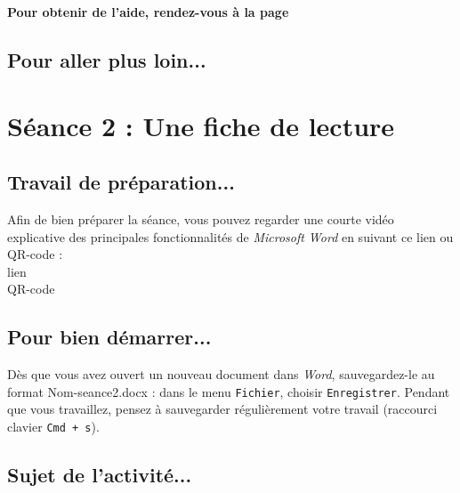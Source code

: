 \textbf{Pour obtenir de l'aide, rendez-vous à la page \pageref{aide_seancesWord3}}

\subsection{Pour aller plus loin...}

\vfill




%
%
%
%

\pagebreak

\section{Séance 2 : Une fiche de lecture}\label{ficheTexte4e3}

\subsection{Travail de préparation...}

Afin de bien préparer la séance, vous pouvez regarder une courte vidéo explicative des principales fonctionnalités de \emph{Microsoft Word} en suivant ce lien ou QR-code :\\

lien\\
QR-code

\subsection{Pour bien démarrer...}

Dès que vous avez ouvert un nouveau document dans \emph{Word}, sauvegardez-le au format Nom-seance2.docx : dans le menu \texttt{Fichier}, choisir \texttt{Enregistrer}. Pendant que vous travaillez, pensez à sauvegarder régulièrement votre travail (raccourci clavier \texttt{Cmd + s}).   


\subsection{Sujet de l'activité...}

\vspace{10pt}

